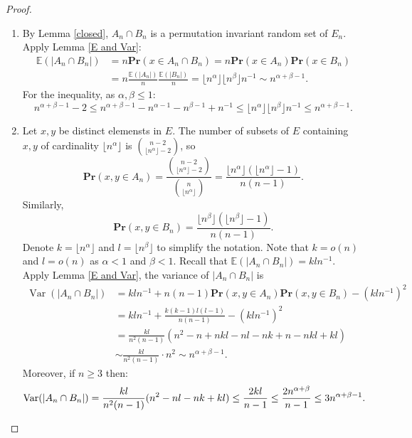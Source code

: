 \documentclass{article}
\DeclareMathOperator{\Var}{Var}
\newcommand{\moinsun}{^{-1}}
\def\Pr{\mathbf{Pr}}
\newcommand\flr[1]{\lfloor #1 \rfloor}
\theoremstyle{remark}
\begin{document}
\begin{proof}\quad
\begin{enumerate}[$(i)$]
    \item By Lemma \ref{closed}, $A_n\cap B_n$ is a permutation invariant random set of $E_n$. Apply Lemma \ref{E and Var}:
    \[\begin{split}\mathbb{E}(|A_n\cap B_n|)& = n \Pr(x\in A_n\cap B_n) = n \Pr(x\in A_n)\Pr(x\in B_n)\\
    & = n\frac{\mathbb{E}(|A_n|)}{n}\frac{\mathbb{E}(|B_n|)}{n}
    = \flr{n^\alpha}\flr{n^\beta}n\moinsun \sim n^{\alpha + \beta -1}. \end{split}\]
    For the inequality, as $\alpha, \beta\leq 1$:
    \[n^{\alpha+\beta-1}-2\leq n^{\alpha+\beta-1} - n^{\alpha-1} - n^{\beta-1} + n\moinsun\leq  \flr{n^\alpha}\flr{n^\beta}n\moinsun \leq n^{\alpha+\beta-1}.\]
    \item Let $x,y$ be distinct elemensts in $E$. The number of subsets of $E$ containing $x,y$ of cardinality $\flr{n^\alpha}$ is $\binom{n-2}{\flr{n^\alpha}-2}$, so
    \[\Pr(x,y\in A_n) = \frac{\binom{n-2}{\flr{n^\alpha}-2}}{\binom{n}{\flr{n^\alpha}}} = \frac{\flr{n^\alpha}(\flr{n^\alpha}-1)}{n(n-1)}.\]
    Similarly,
    \[\Pr(x,y\in B_n) = \frac{\flr{n^\beta}(\flr{n^\beta}-1)}{n(n-1)}.\]
    Denote $k=\flr{n^\alpha}$ and $l=\flr{n^\beta}$ to simplify the notation. Note that $k = o(n)$ and $l=o(n)$ as $\alpha<1$ and $\beta<1$. Recall that $\mathbb{E}(|A_n\cap B_n|) = kln\moinsun$. Apply Lemma \ref{E and Var}, the variance of $|A_n\cap B_n|$ is
    \[\begin{split}
        \Var(|A_n\cap B_n|) & = kln\moinsun +n(n-1)\Pr(x,y\in A_n)\Pr(x,y\in B_n)-(kln\moinsun)^2\\
        & = kln\moinsun +\frac{k(k-1)l(l-1)}{n(n-1)}-(kln\moinsun)^2\\
        & = \frac{kl}{n^2(n-1)}(n^2-n+nkl-nl-nk+n-nkl+kl)\\
        & \sim \frac{kl}{n^2(n-1)}\cdot n^2 \sim n^{\alpha+\beta-1}.
        \end{split}\]
    Moreover, if $n\geq 3$ then:
    \[\Var(|A_n\cap B_n|) = \frac{kl}{n^2(n-1)}(n^2-nl-nk+kl)\\
    \leq \frac{2kl}{n-1}\leq \frac{2n^{\alpha+\beta}}{n-1}\leq 3n^{\alpha+\beta-1}.\]
    

\end{enumerate}
\end{proof}
\end{document}
